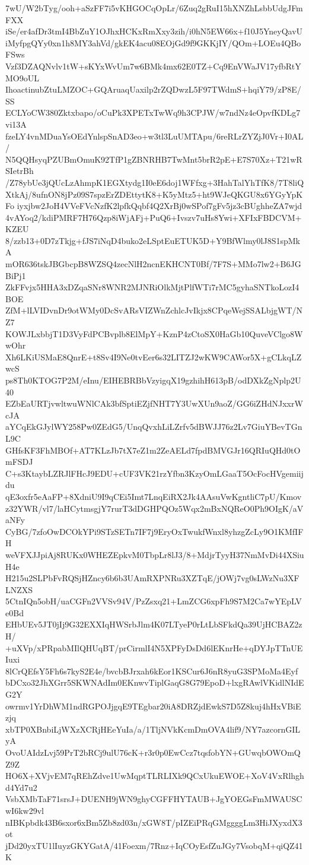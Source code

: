 7wU/W2bTyg/ooh+aSzFF7i5vKHGOCqOpLr/6Zuq2gRuI15hXNZhLsbbUdgJFmFXX
iSe/er4afDr3tmI4BbZuY1OJhxHCKxRmXxy3zih/i0hN5EW66x+f10J5YneyQavU
iMyfpgQYy0xn1h8MY3ahVd/gkEK4acu08EOjGd9f9GKKjIY/QOm+LOEu4QBoFSws
Vzf3DZAQNvlv1tW+sKYxWvUm7w6BMk4mx62E0TZ+Cq9EnVWaJV17yfbRtYMO9oUL
IhoactinubZtuLMZOC+GQAruaqUaxilp2rZQDwzL5F97TWdmS+hqiY79/zP8E/SS
ECLYoCW380Zktxbapo/oCuPk3XPETxTwWq9h3CPJW/w7ndNz4eOpvfKDLg7vi13A
fzeLY4vnMDuaYsOEdYnlspSnAD3eo+w3tl3LuUMTApu/6reRLrZYZjJ0Vr+I0AL/
N5QQHsyqPZUBmOmuK92TfP1gZBNRHB7TwMnt5brR2pE+E7S70Xz+T21wRSIetrBh
/Z78ybUe3jQUcLzAhmpK1EGXtydg1I0eE6doj1WFfxg+3HahTalYhTfK8/7T8liQ
XtkAj/8ufnON8jPz09S7spzErZDEttytK8+K5yMtz5+ht9WJeQKGU8x6YGyYpKFo
iyxjbw2JoH4VVeFVcNzfK2lpfkQqbf4Q2XrBj0wSPof7gFv5jz3cBUghheZA7wjd
4vAYoq2/kdiPMRF7H76Qzp8iWjAFj+PuQ6+Ivszv7uHs8Ywi+XFIxFBDCVM+KZEU
8/zzb13+0D7zTkjg+fJS7iNqD4buko2eLSptEuETUK5D+Y9BfWlmy0lJ8S1spMkA
mOR636tskJBGbcpB8WZSQ4zecNlH2ncnEKHCNT0Bf/7F7S+MMo7lw2+B6JGBiPj1
ZkFFvjx5HHA3xDZqaSNr8WNR2MJNRiOlkMjtPlfWTi7rMC5gyhaSNTkoLozI4BOE
ZfM+lLVIDvnDr9otWMy0DcSvARsVIZWnZchlcJvIkjx8CPqeWejSSALbjgWT/NZ7
KOWJLxbbjT1D3VyFdPCBvplb8ElMpY+KznP4zCtoSX0HaGb10QuveVClgo8WwOhr
Xh6LKiUSMaE8QnrE+t8Sv4I9Ne0tvEer6s32LITZJ2wKW9CAWor5X+gCLkqLZwcS
ps8Th0KTOG7P2M/eInu/EIHEBRBbVzyigqX19gzhihH613pB/odDXkZgNplp2U40
EZbEaURTjvwltwuWNlCAk3bfSptiEZjfNHT7Y3UwXUn9aoZ/GG6iZHdNJxxrWcJA
aYCqEkGJylWY258Pw0ZEdG5/UnqQvxhLiLZrfv5dBWJJ76z2Lv7GiuYBevTGnL9C
GHfsKF3FhMBOf+AT7KLzJb7tX7eZ1m2ZeAELd7fpdBMVGJr16QRIuQHd0tOmFSDJ
C+s3KtaybLZRJlFHcJ9EDU+cUF3VK21rzYfbn3KzyOmLGaaT5OcFocHVgemiijdu
qE3oxfr5eAaFP+8XdniU9I9qCEi5Imt7LnqEiRX2Jk4AAsuVwKgntliC7pU/Kmov
z32YWR/vl7/laHCytmsgjY7rurT3dDGHPQOz5Wqx2mBxNQReO0Ph9OIgK/aVaNFy
CyBG/7zfoOwDCOkYPi9STzSETn7IF7j9EryOxTwukfWnxl8yhzgZcLy9O1KMfIFH
weVFXJJpiAj8RUKx0WHEZEpkvM0TbpLr8lJ3/8+MdjrTyyH37NmMvDi44XSiuH4e
H215u2SLPbFvRQSjHZncy6b6b3UAmRXPNRu3XZTqE/jOWj7vg0sLWzNu3XFLNZXS
5CtnIQn5obH/uaCGFn2VVSv94V/PzZsxq21+LmZCG6xpFh9S7M2Ca7wYEpLVe0Bd
EHbUEv5JT0jIj9G32EXXIqHWSrbJlm4K07LTyeP0rLtLbSFkdQa39UjHCBAZ2zH/
+uXVp/xPRpabMIlQHUqBT/prCirmlI4N5XPFyDsDd6lEKnrHe+qDYJpTTnUEIuxi
8lCrQEfsY5Fh6s7kyS2E4e/bvcbBJrxah6kEor1KSCur6J6nR8yuG3SPMoMa4Eyf
bDCxo32JhXGrr5SKWNAdIm0EKnwvTiplGaqG8G79EpoD+lxgRAwlVKidlNIdEG2Y
owrmv1YrDhWM1ndRGPOJjgqE9TEgbar20iA8DRZjdEwkS7D5Z8kuj4hHxVBiEzjq
xbTP0XBnbiLjWXzXCRjHEeYuIa/a/1TljNVkKcmDmOVA4lif9/NY7azcornGILyA
OvoUAIdzLvj59PrT2bRCj9ulU76cK+r3r0p0EwCcz7tqsfobYN+GUwqbOWOmQZ9Z
HO6X+XVjvEM7qREhZdve1UwMqptTLRLIXk9QCxUkuEWOE+XoV4VxRlhghd4Yd7u2
VsbXMbTaF71srsJ+DUENH9jWN9ghyCGFFHYTAUB+JgYOEGsFmMWAUSCwI6kw29vl
nIBKpbdk43B6sxor6xBm5Zb8zd03n/xGW8T/pIZEiPRqGMggggLm3HiJXyxdX3ot
jDd20yxTU1lIuyzGKYGatA/41Foexm/7Rnz+IqCOyEsfZuJGy7VsobqM+qiQZ41K
